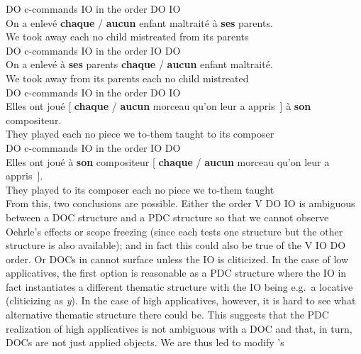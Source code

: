 \documentclass[output=paper]{langsci/langscibook}
\begin{document}
\ea \label{doio25}
\ea  DO c-commands IO in the order DO IO\\
\gll On {a enlev\'{e}} \textbf{chaque} / \textbf{aucun} enfant maltrait\'e
\`{a} {\bf ses} parents.\\
We {took away} each {} no child mistreated from its parents\\
\ex  DO c-commands IO in the order IO DO\\
\gll On {a enlev\'{e}} \`{a} {\bf ses} parents \textbf{chaque} / \textbf{aucun} enfant maltrait\'e.\\
We {took away} from its parents each {} no child mistreated\\
\z
\ex \label{doio26}
\ea  DO c-commands IO in the order DO IO\\
\gll Elles {ont  jou\'{e}} [ {\bf chaque} / {\bf aucun} morceau qu'on leur {a
appris}~] \`{a} {\bf son} compositeur.\\
They played {} each {} no piece we to-them {} taught to its composer\\
\ex  DO c-commands IO in the order IO DO\\
\gll Elles  {ont jou\'{e}}  \`{a} {\bf son} compositeur [
\textbf{chaque} / \textbf{aucun} morceau qu'on leur {a appris}~].\\
They played to its composer {} each {} no piece we to-them taught \\
\z
\z
%
From this, two conclusions are possible. Either the order V DO IO is ambiguous
between a \gls{DOC} structure and a
\gls{PDC} structure so that we cannot
observe Oehrle's effects or scope freezing (since each tests one structure but
the other structure is also available); and in fact this could also be true of
the V IO DO order. Or \glspl{DOC} in
 cannot surface unless the IO is cliticized. In the case of low
applicatives, the first option is reasonable as a \gls{PDC} structure where the IO in fact instantiates a different
thematic structure with the IO being e.g.\ a locative (cliticizing as {\it y}).
In the case of high applicatives, however, it is hard to see what alternative
thematic structure there could be. This suggests that the
\gls{PDC} realization of high
applicatives is not ambiguous with a \gls{DOC}
and that, in turn, \glspl{DOC} are not just applied objects. We are thus led to
modify \citeauthor{anagnostopoulou2005cross}'s
\end{document}
